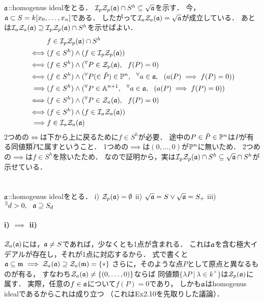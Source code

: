 \documentclass[a4paper]{jsarticle}
\begin{document}
\section{ } %
    $\mathfrak{a}$::homogenus idealをとる．
    $\mathcal{I}_p \mathcal{Z}_p(\mathfrak{a}) \cap S^h \subseteq \sqrt{\mathfrak{a}}$を示す．
    今，$\mathfrak{a} \subset S=k[x_0,\dots,x_n]$である．
    したがって$\mathcal{I}_a \mathcal{Z}_a(\mathfrak{a})=\sqrt{\mathfrak{a}}$が成立している．
    あとは$\mathcal{I}_a \mathcal{Z}_a(\mathfrak{a}) \supseteq \mathcal{I}_p \mathcal{Z}_p(\mathfrak{a}) \cap S^h$を示せばよい．
    \begin{align*}
        {}&     f \in \mathcal{I}_p \mathcal{Z}_p(\mathfrak{a}) \cap S^h \\
        \iff&   (f \in S^h) \land (f \in \mathcal{I}_p \mathcal{Z}_p(\mathfrak{a})) \\
        \iff&   (f \in S^h) \land ( {}^{\forall} P \in \mathcal{Z}_p(\mathfrak{a}),~~ f(P)=0 ) \\
        \iff&   (f \in S^h) \land ( {}^{\forall} P (\in \tilde{P} )\in \mathbb{P}^{n},~~ {}^{\forall} a \in \mathfrak{a},~~ (a(P) \implies f(P)=0) ) \\
        \implies&
                (f \in S^h) \land ( {}^{\forall} P \in \mathbb{A}^{n+1},~~ {}^{\forall} a \in \mathfrak{a},~~ (a(P) \implies f(P)=0) ) \\
        \iff&   (f \in S^h) \land ( {}^{\forall} P \in \mathcal{Z}_a(\mathfrak{a}),~~ f(P)=0 ) \\
        \iff&   (f \in S^h) \land ( f \in \mathcal{I}_a \mathcal{Z}_a(\mathfrak{a}) ) \\
        \implies&   f \in \mathcal{I}_a \mathcal{Z}_a(\mathfrak{a})
    \end{align*}
    2つめの$\iff$は下から上に戻るために$f \in S^h$が必要．
    途中の$P \in \tilde{P} \in \mathbb{P}^{n}$は$P$が有る同値類$\tilde{P}$に属すということ．
    1つめの$\implies$は$(0,\dots,0)$が$\mathbb{P}^n$に無いため．
    2つめの$\implies$は$f \in S^h$を除いたため．
    なので証明から，実は$\mathcal{I}_p \mathcal{Z}_p(\mathfrak{a}) \cap S^h \subseteq \sqrt{\mathfrak{a}} \cap S^h$が示せている．

\section{ } %
    $\mathfrak{a}$::homogenus idealをとる．
    i) $\mathcal{Z}_p(\mathfrak{a})=\emptyset$
    ii) $\sqrt{\mathfrak{a}}=S \lor \sqrt{\mathfrak{a}}=S_{+}$
    iii) ${}^{\exists} d>0,~~ \mathfrak{a} \supseteq S_d$

    \paragraph{i) $\implies$ ii)}
    $\mathcal{Z}_a(\mathfrak{a})$には，$\mathfrak{a} \neq S$であれば，少なくとも1点が含まれる．
    これは$\mathfrak{a}$を含む極大イデアルが存在し，それが1点に対応するから．
    式で書くと$\mathfrak{a} \subseteq \mathfrak{m} \implies \mathcal{Z}_a(\mathfrak{a}) \supseteq \mathcal{Z}_a(\mathfrak{m})=\{ \ast \}$
    さらに，そのような点$P$として原点と異なるものが有る，
    すなわち$\mathcal{Z}_a(\mathfrak{a}) \neq \{(0,\dots,0)\}$ならば
    同値類$\{ \lambda P ~|~ \lambda \in k^{\times} \}$は$\mathcal{Z}_p(\mathfrak{a})$に属す．
    実際，任意の$f \in \mathfrak{a}$について$f(P)=0$であり，
    しかも$\mathfrak{a}$はhomogenus idealであるからこれは成り立つ
    （これはEx2.10を先取りした議論）．
\end{document}
